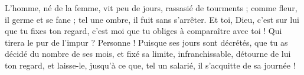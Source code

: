 L’homme, né de la femme, vit peu de jours, rassasié de tourments ;
comme fleur, il germe et se fane ; tel une ombre, il fuit sans s’arrêter.
Et toi, Dieu, c’est sur lui que tu fixes ton regard, c’est moi que tu obliges à comparaître avec toi !
Qui tirera le pur de l’impur ? Personne !
Puisque ses jours sont décrétés, que tu as décidé du nombre de ses mois, et fixé sa limite, infranchissable,
détourne de lui ton regard, et laisse-le, jusqu’à ce que, tel un salarié, il s’acquitte de sa journée !